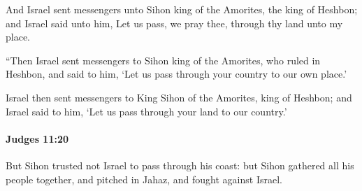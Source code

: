 			\begin{versebox}
					\item[BHS] 
					\item[ASV] And Israel sent messengers unto Sihon king of the Amorites, the king of Heshbon; and Israel said unto him, Let us pass, we pray thee, through thy land unto my place.
					\item[NIV] “Then Israel sent messengers to Sihon king of the Amorites, who ruled in Heshbon, and said to him, ‘Let us pass through your country to our own place.’
					\item[NRSV] Israel then sent messengers to King Sihon of the Amorites, king of Heshbon; and Israel said to him, ‘Let us pass through your land to our country.’
			\end{versebox}

		\paragraph{Judges 11:20} %
			\label{JUDGES-11-20}

			But Sihon trusted not Israel to pass through his coast: but Sihon gathered all his people together, and pitched in Jahaz, and fought against Israel.

